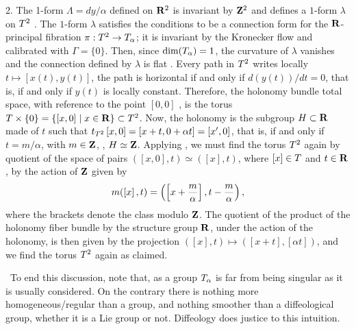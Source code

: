 \begin{article}
  2. The 1-form $\Lambda = dy/\alpha$ defined on ${\mathbf R}^2$ is invariant by ${\mathbf Z}^2$ and defines a $1$-form $\lambda$ on $T^2$ .
  The $1$-form $\lambda$ satisfies the conditions to be a connection form for the ${\mathbf R}$-principal fibration $\pi : T^2 \to T_\alpha$;
  it is invariant by the Kronecker flow and calibrated  with $\Gamma = \{0\}$.
  Then,
  since $\mathrm{dim}(T_\alpha) = 1$,
  the curvature of $\lambda$ vanishes and the connection defined by $\lambda$ is flat .
  Every path in $T^2$ writes locally $t\mapsto \left[x(t),y(t)\right]$,
  the path is horizontal if and only if $d(y(t))/dt = 0$,
  that is,
  if and only if $y(t)$ is locally constant.
  Therefore,
  the holonomy bundle total space,
  with reference to the point $\left[0,0\right]$ ,
  is the torus $T \times \{0\} = \{ \left[x,0\right] \mid x \in {\mathbf R} \} \subset T^2$.
  Now,
  the holonomy is the subgroup $H \subset {\mathbf R}$ made of $t$ such that $t_{T^2}\left[x,0\right] = \left[x + t, 0 + \alpha t\right] = \left[x',0\right]$,
  that is,
  if and only if $t = m/\alpha$, with $m \in {\mathbf Z}$,
  \ie,
  $H \simeq {\mathbf Z}$.
  Applying ,
  we must find the torus $T^2$ again by quotient of the space of pairs $(\left[x,0\right],t) \simeq (\left[x\right],t)$,
  where $\left[x\right] \in T$ and $t \in {\mathbf R}$,
  by the action of ${\mathbf Z}$ given by
  $$%
  m(\left[x\right],t) = \left(\left[x + {m \over \alpha} \right], t - {m \over \alpha} \right),
  $$%
  where the brackets denote the class modulo ${\mathbf Z}$.
  The quotient of the product of the holonomy fiber bundle by the structure group ${\mathbf R}$,
  under the action of the holonomy,
  is then given by the projection $(\left[x\right],t) \mapsto (\left[x+t\right], \left[\alpha t\right])$,
  and we find the torus $T^2$ again as claimed.
  
  \Note~To end this discussion,
  note that,
  as a group $T_\alpha$ is far from being singular as it is usually considered.
  On the contrary there is nothing more homogeneous/regular than a group,
  and nothing smoother than a diffeological group,
  whether it is a Lie group or not.
  Diffeology does justice to this intuition.
\end{article} %

